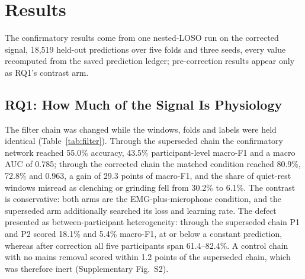 \documentclass[journal]{IEEEtran}
\begin{document}
\section{Results}

The confirmatory results come from one nested-LOSO run on the corrected signal, 18,519 held-out predictions over five folds and three seeds, every value recomputed from the saved prediction ledger; pre-correction results appear only as RQ1's contrast arm.

\subsection{RQ1: How Much of the Signal Is Physiology}
\label{sec:rq1}

The filter chain was changed while the windows, folds and labels were held identical (Table~\ref{tab:filter}). Through the superseded chain the confirmatory network reached 55.0\% accuracy, 43.5\% participant-level macro-F1 and a macro AUC of 0.785; through the corrected chain the matched condition reached 80.9\%, 72.8\% and 0.963, a gain of 29.3 points of macro-F1, and the share of quiet-rest windows misread as clenching or grinding fell from 30.2\% to 6.1\%. The contrast is conservative: both arms are the EMG-plus-microphone condition, and the superseded arm additionally searched its loss and learning rate. The defect presented as between-participant heterogeneity: through the superseded chain P1 and P2 scored 18.1\% and 5.4\% macro-F1, at or below a constant prediction, whereas after correction all five participants span 61.4--82.4\%. A control chain with no mains removal scored within 1.2 points of the superseded chain, which was therefore inert (Supplementary Fig.~S2).
\end{document}

